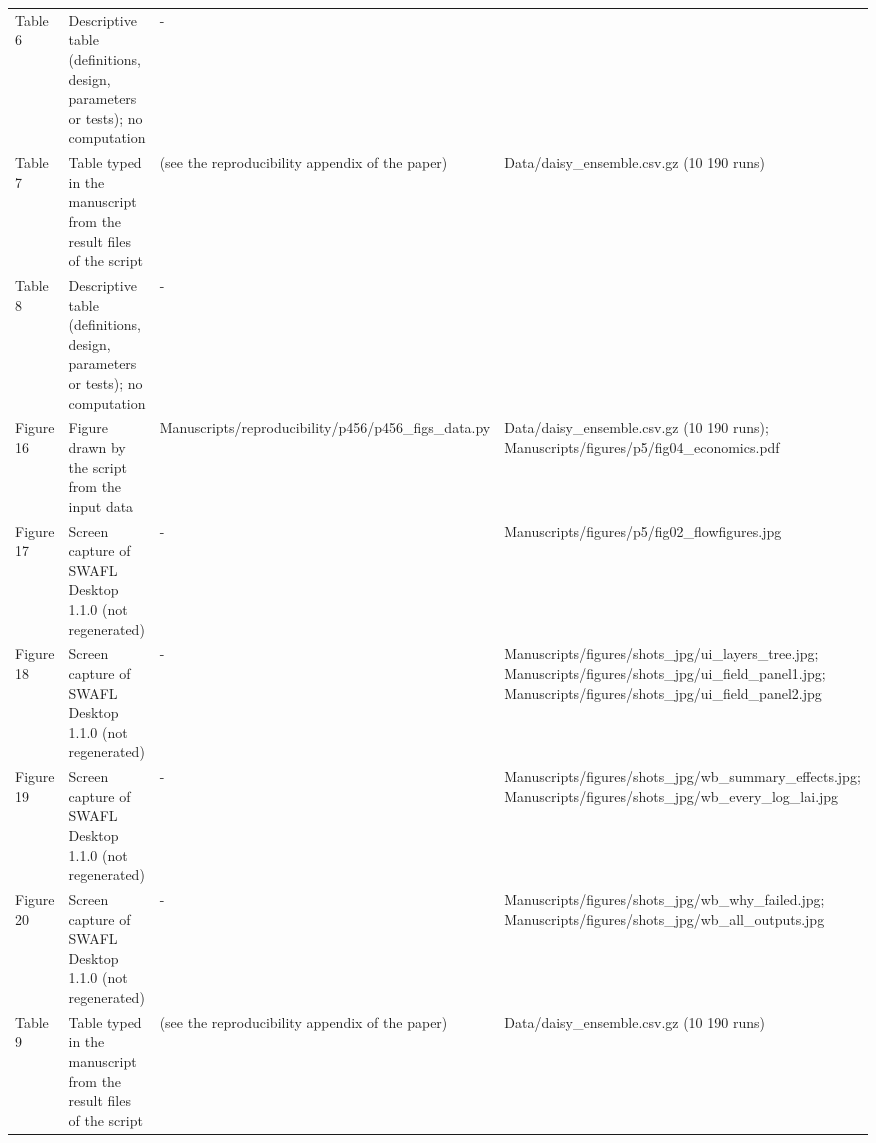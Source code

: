 {\begin{longtable}{p{}p{}p{}p{}}
{}Table 6 & Descriptive table (definitions, design, parameters or tests); no computation & - & \\
{}Table 7 & Table typed in the manuscript from the result files of the script & (see the reproducibility appendix of the paper) & Data/\allowbreak{}daisy\_\allowbreak{}ensemble.csv.gz (10 190 runs)\\
{}Table 8 & Descriptive table (definitions, design, parameters or tests); no computation & - & \\
{}Figure 16 & Figure drawn by the script from the input data & Manuscripts/\allowbreak{}reproducibility/\allowbreak{}p456/\allowbreak{}p456\_\allowbreak{}figs\_\allowbreak{}data.py & Data/\allowbreak{}daisy\_\allowbreak{}ensemble.csv.gz (10 190 runs);  Manuscripts/\allowbreak{}figures/\allowbreak{}p5/\allowbreak{}fig04\_\allowbreak{}economics.pdf\\
{}Figure 17 & Screen capture of SWAFL Desktop 1.1.0 (not regenerated) & - & Manuscripts/\allowbreak{}figures/\allowbreak{}p5/\allowbreak{}fig02\_\allowbreak{}flowfigures.jpg\\
{}Figure 18 & Screen capture of SWAFL Desktop 1.1.0 (not regenerated) & - & Manuscripts/\allowbreak{}figures/\allowbreak{}shots\_\allowbreak{}jpg/\allowbreak{}ui\_\allowbreak{}layers\_\allowbreak{}tree.jpg;  Manuscripts/\allowbreak{}figures/\allowbreak{}shots\_\allowbreak{}jpg/\allowbreak{}ui\_\allowbreak{}field\_\allowbreak{}panel1.jpg;  Manuscripts/\allowbreak{}figures/\allowbreak{}shots\_\allowbreak{}jpg/\allowbreak{}ui\_\allowbreak{}field\_\allowbreak{}panel2.jpg\\
{}Figure 19 & Screen capture of SWAFL Desktop 1.1.0 (not regenerated) & - & Manuscripts/\allowbreak{}figures/\allowbreak{}shots\_\allowbreak{}jpg/\allowbreak{}wb\_\allowbreak{}summary\_\allowbreak{}effects.jpg;  Manuscripts/\allowbreak{}figures/\allowbreak{}shots\_\allowbreak{}jpg/\allowbreak{}wb\_\allowbreak{}every\_\allowbreak{}log\_\allowbreak{}lai.jpg\\
{}Figure 20 & Screen capture of SWAFL Desktop 1.1.0 (not regenerated) & - & Manuscripts/\allowbreak{}figures/\allowbreak{}shots\_\allowbreak{}jpg/\allowbreak{}wb\_\allowbreak{}why\_\allowbreak{}failed.jpg;  Manuscripts/\allowbreak{}figures/\allowbreak{}shots\_\allowbreak{}jpg/\allowbreak{}wb\_\allowbreak{}all\_\allowbreak{}outputs.jpg\\
{}Table 9 & Table typed in the manuscript from the result files of the script & (see the reproducibility appendix of the paper) & Data/\allowbreak{}daisy\_\allowbreak{}ensemble.csv.gz (10 190 runs)\\

\end{longtable}}
